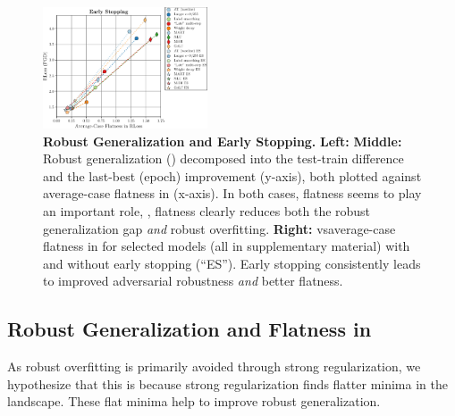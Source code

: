\begin{figure}[t]
\begin{minipage}[t]{0.01\textwidth}
		\hspace*{4px}{\color{black!75}\rule{0.65px}{3.65cm}}
	\end{minipage}
	\hspace*{2px}
	\begin{minipage}[t]{0.265\textwidth}
		\vspace*{0px}
		
		\includegraphics[height=3.6cm]{plots_main_flatness_correlation_seq_early_stopping_line}
	\end{minipage}	
	\vspace*{-8px}
	\caption{\textbf{Robust Generalization and Early Stopping.} \textbf{Left:}  \textbf{Middle:} Robust generalization (\RCE) decomposed into the test-train difference and the last-best (epoch) improvement (y-axis), both plotted against average-case flatness in \RCE(x-axis). In both cases, flatness seems to play an important role, \ie, flatness clearly reduces both the robust generalization gap \emph{and} robust overfitting. \textbf{Right:} \RCE vs\onedot average-case flatness in \RCE for selected models (all in supplementary material) with and without early stopping (``ES''). Early stopping consistently leads to improved adversarial robustness \emph{and} better flatness.}
	\label{fig:experiments-flatness-gap}
	\vspace*{-6px}
\end{figure}

\subsection{Robust Generalization and Flatness in \RCE}
\label{subsec:experiments-flatness}

As robust overfitting is primarily avoided through strong regularization, we hypothesize that this is because strong regularization finds flatter minima in the \RCE landscape. These flat minima help to improve robust generalization.

